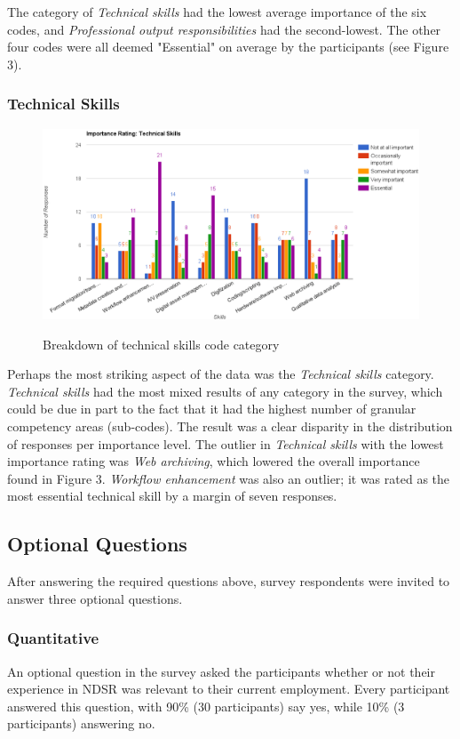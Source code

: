 \documentclass{acm_proc_article-sp}
\begin{document}
The category of \textit{Technical skills} had the lowest average importance of the six codes, and \textit{Professional output responsibilities} had the second-lowest. The other four codes were all deemed "Essential" on average by the participants (see Figure 3). 

\subsubsection{Technical Skills}
\begin{figure}
\centering
	\includegraphics[keepaspectratio, scale=0.5]{tech_skills.png} 
	\label{Figure 4.}
	\caption{Breakdown of technical skills code category}
\end{figure}
Perhaps the most striking aspect of the data was the \textit{Technical skills} category. \textit{Technical skills} had the most mixed results of any category in the survey, which could be due in part to the fact that it had the highest number of granular competency areas (sub-codes). The result was a clear disparity in the distribution of responses per importance level. The outlier in \textit{Technical skills} with the lowest importance rating was \textit{Web archiving}, which lowered the overall importance found in Figure 3. \textit{Workflow enhancement} was also an outlier; it was rated as the most essential technical skill by a margin of seven responses. 

\subsection{Optional Questions}
After answering the required questions above, survey respondents were invited to answer three optional questions.

\subsubsection{Quantitative}
An optional question in the survey asked the participants whether or not their experience in NDSR was relevant to their current employment. Every participant answered this question, with 90\% (30 participants) say yes, while 10\% (3 participants) answering no.
\end{document}
